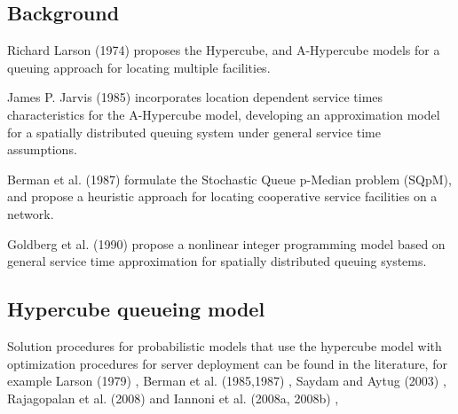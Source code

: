 \subsection{Background}
\begin{frame}[allowframebreaks]
  Richard Larson (1974) \cite{larson1974hypercube,larson1975approximating}
  proposes the Hypercube, and A-Hypercube models
  for a queuing approach for locating multiple facilities.

  James P. Jarvis (1985) \cite{jarvis1985approximating} incorporates
  location dependent service times characteristics for the A-Hypercube model,
  developing an approximation model for a spatially distributed queuing system
  under general service time assumptions.

  Berman et al. (1987) \cite{berman1987stochastic}
  formulate the Stochastic Queue p-Median problem (SQpM),
  and propose a heuristic approach for locating cooperative service facilities
  on a network.

  Goldberg et al. (1990) \cite{goldberg1990validating}
  propose a nonlinear integer programming model
  based on general service time approximation
  for spatially distributed queuing systems.

\end{frame}

\subsection{Hypercube queueing model}
\begin{frame}
Solution procedures for probabilistic models that use the hypercube model
with optimization procedures 
for server deployment can be found in the literature, for example
Larson (1979) \cite{larson1978structural}, 
Berman et al. (1985,1987) \cite{berman1985optimal,berman1987stochastic}, 
Saydam and Aytug (2003) \cite{saydam2003accurate}, 
Rajagopalan et al. (2008) \cite{rajagopalan2008multiperiod} and 
Iannoni et al. (2008a, 2008b) \cite{iannoni2008hypercube,iannoni2009optimization},
\end{frame}
